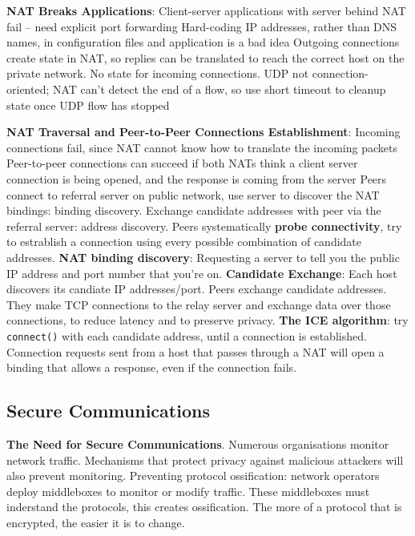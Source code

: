 \documentclass{article}
\begin{document}
\noindent \textbf{NAT Breaks Applications}:
Client-server applications with server behind NAT fail – need explicit port forwarding
Hard-coding IP addresses, rather than DNS names, in configuration files and application is a bad idea
Outgoing connections create state in NAT, so replies can be translated to reach the correct host on the private network.
No state for incoming connections.
UDP not connection-oriented; NAT can’t detect the end of a flow, so use short timeout to cleanup state once UDP flow has stopped

\noindent \textbf{NAT Traversal and Peer-to-Peer Connections Establishment}:
Incoming connections fail, since NAT cannot know how to translate the incoming packets
Peer-to-peer connections can succeed if both NATs think a client server connection is being opened, and the response is coming from the server
Peers connect to referral server on public network, use server to discover the NAT bindings: binding discovery.
Exchange candidate addresses with peer via the referral server: address discovery.
Peers systematically \textbf{probe connectivity}, try to estrablish a connection using every possible combination of candidate addresses.
\textbf{NAT binding discovery}: Requesting a server to tell you the public IP address and port number that you're on.
\textbf{Candidate Exchange}: Each host discovers its candiate IP addresses/port. Peers exchange candidate addresses.
They make TCP connections to the relay server and exchange data over those connections, to reduce latency and to preserve privacy.
\textbf{The ICE algorithm}: try \texttt{connect()} with each candidate address, until a connection is established.
Connection requests sent from a host that passes through a NAT will open a binding that allows a response, even if the connection fails.


\subsection*{Secure Communications}

\textbf{The Need for Secure Communications}. Numerous organisations monitor network traffic.
Mechanisms that protect privacy against malicious attackers will also prevent monitoring.
Preventing protocol ossification: network operators deploy middleboxes to monitor or modify traffic.
These middleboxes must inderstand the protocols, this creates ossification.
The more of a protocol that is encrypted, the easier it is to change.
\end{document}
